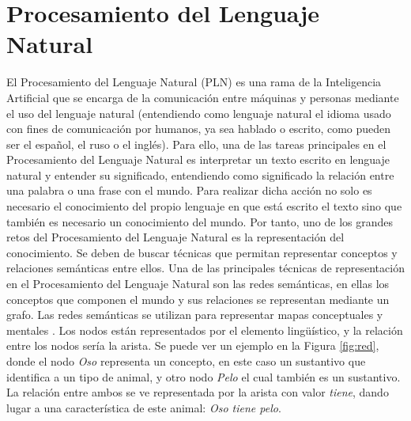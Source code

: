\section{Procesamiento del Lenguaje Natural}
\label{cap:sec:lenguajenatural}
El Procesamiento del Lenguaje Natural (PLN) es una rama de la Inteligencia Artificial que se encarga de la comunicación entre máquinas y personas mediante el uso del lenguaje natural (entendiendo como lenguaje natural el idioma usado con fines de comunicación por humanos, ya sea hablado o escrito, como pueden ser el español, el ruso o el inglés). 
Para ello, una de las tareas principales en el Procesamiento del Lenguaje Natural es interpretar un texto escrito en lenguaje natural y entender su significado, entendiendo como significado la relación entre una palabra o una frase con el mundo. Para realizar dicha acción no solo es necesario el conocimiento del propio lenguaje en que está escrito el texto sino que también es necesario un conocimiento del mundo. Por tanto, uno de los grandes retos del Procesamiento del Lenguaje Natural es la representación del conocimiento. Se deben de buscar técnicas que permitan representar conceptos y relaciones semánticas entre ellos. 
Una de las principales técnicas de representación en el Procesamiento del Lenguaje Natural son las redes semánticas, en ellas los conceptos que componen el mundo y sus relaciones se representan mediante un grafo. Las redes semánticas se utilizan para representar mapas conceptuales y mentales \citep{redSemantica2018}.
Los nodos están representados por el elemento lingüístico, y la relación entre los nodos sería la arista. Se puede ver un ejemplo en la Figura \ref{fig:red}, donde el nodo \textit{Oso} representa un concepto, en este caso un sustantivo que identifica a un tipo de animal, y otro nodo \textit{Pelo} el cual también es un sustantivo. La relación entre ambos se ve representada por la arista con valor \textit{tiene}, dando lugar a una característica de este animal: \textit{Oso tiene pelo}.
 

